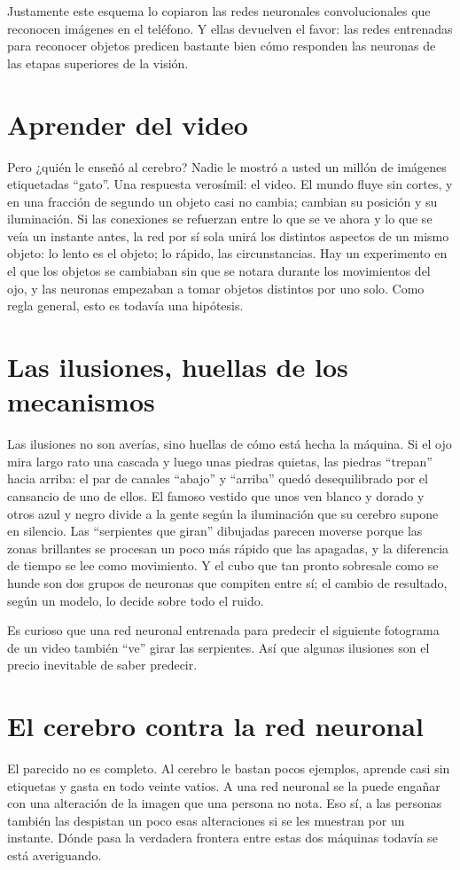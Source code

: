 Justamente este esquema lo copiaron las redes neuronales convolucionales que reconocen imágenes en el teléfono. Y ellas devuelven el favor: las redes entrenadas para reconocer objetos predicen bastante bien cómo responden las neuronas de las etapas superiores de la visión.

\section*{Aprender del video}

Pero ¿quién le enseñó al cerebro? Nadie le mostró a usted un millón de imágenes etiquetadas “gato”. Una respuesta verosímil: el video. El mundo fluye sin cortes, y en una fracción de segundo un objeto casi no cambia; cambian su posición y su iluminación. Si las conexiones se refuerzan entre lo que se ve ahora y lo que se veía un instante antes, la red por sí sola unirá los distintos aspectos de un mismo objeto: lo lento es el objeto; lo rápido, las circunstancias. Hay un experimento en el que los objetos se cambiaban sin que se notara durante los movimientos del ojo, y las neuronas empezaban a tomar objetos distintos por uno solo. Como regla general, esto es todavía una hipótesis.

\section*{Las ilusiones, huellas de los mecanismos}

Las ilusiones no son averías, sino huellas de cómo está hecha la máquina. Si el ojo mira largo rato una cascada y luego unas piedras quietas, las piedras “trepan” hacia arriba: el par de canales “abajo” y “arriba” quedó desequilibrado por el cansancio de uno de ellos. El famoso vestido que unos ven blanco y dorado y otros azul y negro divide a la gente según la iluminación que su cerebro supone en silencio. Las “serpientes que giran” dibujadas parecen moverse porque las zonas brillantes se procesan un poco más rápido que las apagadas, y la diferencia de tiempo se lee como movimiento. Y el cubo que tan pronto sobresale como se hunde son dos grupos de neuronas que compiten entre sí; el cambio de resultado, según un modelo, lo decide sobre todo el ruido.

Es curioso que una red neuronal entrenada para predecir el siguiente fotograma de un video también “ve” girar las serpientes. Así que algunas ilusiones son el precio inevitable de saber predecir.

\section*{El cerebro contra la red neuronal}

El parecido no es completo. Al cerebro le bastan pocos ejemplos, aprende casi sin etiquetas y gasta en todo veinte vatios. A una red neuronal se la puede engañar con una alteración de la imagen que una persona no nota. Eso sí, a las personas también las despistan un poco esas alteraciones si se les muestran por un instante. Dónde pasa la verdadera frontera entre estas dos máquinas todavía se está averiguando.

